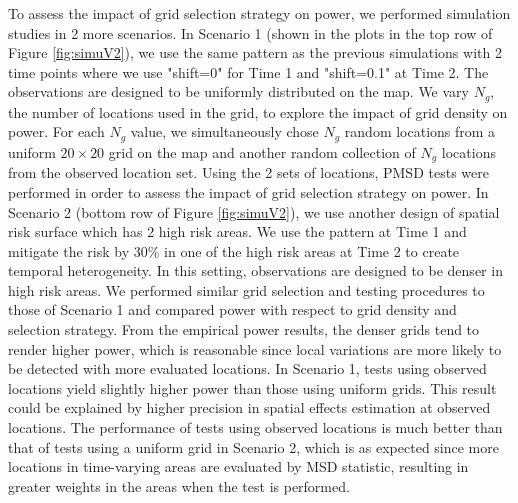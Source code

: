 	To assess the impact of grid selection strategy on power, we performed simulation studies in 2 more scenarios. In Scenario 1 (shown in the plots in the top row of Figure \ref{fig:simuV2}), we use the same pattern as the previous simulations with 2 time points where we use "shift=0" for Time 1 and "shift=0.1" at Time 2. The observations are designed to be uniformly distributed on the map. We vary $N_g$, the number of locations used in the grid, to explore the impact of grid density on power. For each $N_g$ value, we simultaneously chose $N_g$ random locations from a uniform $20\times 20$ grid on the map and another random collection of $N_g$ locations from the observed location set. Using the 2 sets of locations, PMSD tests were performed in order to assess the impact of grid selection strategy on power. In Scenario 2 (bottom row of Figure \ref{fig:simuV2}), we use another design of spatial risk surface which has 2 high risk areas. We use the pattern at Time 1 and mitigate the risk by 30\% in one of the high risk areas at Time 2 to create temporal heterogeneity. In this setting, observations are designed to be denser in high risk areas. We performed similar grid selection and testing procedures to those of Scenario 1 and compared power with respect to grid density and selection strategy. From the empirical power results, the denser grids tend to render higher power, which is reasonable since local variations are more likely to be detected with more evaluated locations. In Scenario 1, tests using observed locations yield slightly higher power than those using uniform grids. This result could be explained by higher precision in spatial effects estimation at observed locations. The performance of tests using observed locations is much better than that of tests using a uniform grid in Scenario 2, which is as expected since more locations in time-varying areas are evaluated by MSD statistic, resulting in greater weights in the areas when the test is performed. 
	

